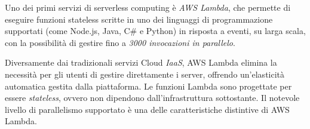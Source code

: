 Uno dei primi servizi di serverless computing è \textit{AWS Lambda}, che permette di eseguire funzioni stateless scritte in uno dei linguaggi di programmazione supportati (come Node.js, Java, C\# e Python) in risposta a eventi, su larga scala, con la possibilità di gestire fino a \textit{3000 invocazioni in parallelo}. 

Diversamente dai tradizionali servizi Cloud \textit{IaaS}, AWS Lambda elimina la necessità per gli utenti di gestire direttamente i server, offrendo un'elasticità automatica gestita dalla piattaforma. Le funzioni Lambda sono progettate per essere \textit{stateless}, ovvero non dipendono dall'infrastruttura sottostante. Il notevole livello di parallelismo supportato è una delle caratteristiche distintive di AWS Lambda.\cite{gimenez2019framework}